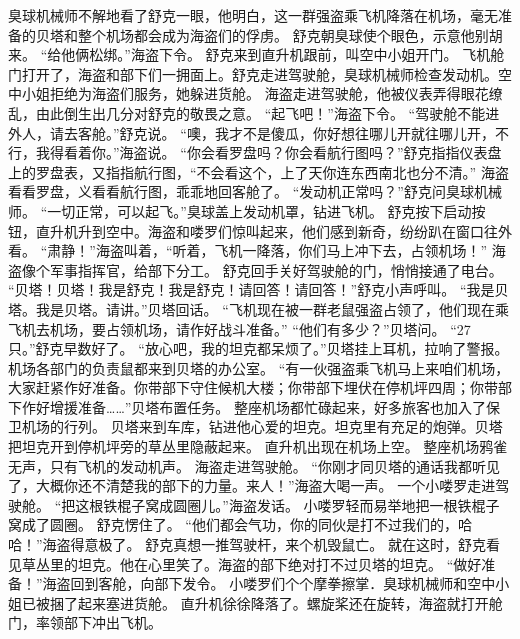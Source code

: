 \documentclass[a4paper,12pt,UTF8,twoside]{ctexbook}
\begin{document}
        臭球机械师不解地看了舒克一眼，他明白，这一群强盗乘飞机降落在机场，毫无准备的贝塔和整个机场都会成为海盗们的俘虏。 
        舒克朝臭球使个眼色，示意他别胡来。 
        “给他俩松绑。”海盗下令。 
        舒克来到直升机跟前，叫空中小姐开门。 
        飞机舱门打开了，海盗和部下们一拥面上。舒克走进驾驶舱，臭球机械师检查发动机。空中小姐拒绝为海盗们服务，她躲进货舱。 
        海盗走进驾驶舱，他被仪表弄得眼花缭乱，由此倒生出几分对舒克的敬畏之意。 
        “起飞吧！”海盗下令。 
        “驾驶舱不能进外人，请去客舱。”舒克说。 
        “噢，我才不是傻瓜，你好想往哪儿开就往哪儿开，不行，我得看着你。”海盗说。 
        “你会看罗盘吗？你会看航行图吗？”舒克指指仪表盘上的罗盘表，又指指航行图，“不会看这个，上了天你连东西南北也分不清。” 
        海盗看看罗盘，义看看航行图，乖乖地回客舱了。 
        “发动机正常吗？”舒克问臭球机械师。 
        “一切正常，可以起飞。”臭球盖上发动机罩，钻进飞机。 
        舒克按下启动按钮，直升机升到空中。海盗和喽罗们惊叫起来，他们感到新奇，纷纷趴在窗口往外看。 
        “肃静！”海盗叫着，“听着，飞机一降落，你们马上冲下去，占领机场！” 
        海盗像个军事指挥官，给部下分工。 
        舒克回手关好驾驶舱的门，悄悄接通了电台。 
        “贝塔！贝塔！我是舒克！我是舒克！请回答！请回答！”舒克小声呼叫。 
        “我是贝塔。我是贝塔。请讲。”贝塔回话。 
        “飞机现在被一群老鼠强盗占领了，他们现在乘飞机去机场，要占领机场，请作好战斗准备。” 
        “他们有多少？”贝塔问。 
        “27只。”舒克早数好了。 
        “放心吧，我的坦克都呆烦了。”贝塔挂上耳机，拉响了警报。 
        机场各部门的负责鼠都来到贝塔的办公室。 
        “有一伙强盗乘飞机马上来咱们机场，大家赶紧作好准备。你带部下守住候机大楼；你带部下埋伏在停机坪四周；你带部下作好增援准备……”贝塔布置任务。 
        整座机场都忙碌起来，好多旅客也加入了保卫机场的行列。 
        贝塔来到车库，钻进他心爱的坦克。坦克里有充足的炮弹。贝塔把坦克开到停机坪旁的草丛里隐蔽起来。 
        直升机出现在机场上空。 
        整座机场鸦雀无声，只有飞机的发动机声。 
        海盗走进驾驶舱。 
        “你刚才同贝塔的通话我都听见了，大概你还不清楚我的部下的力量。来人！”海盗大喝一声。 
        一个小喽罗走进驾驶舱。 
        “把这根铁棍子窝成圆圈儿。”海盗发话。 
        小喽罗轻而易举地把一根铁棍子窝成了圆圈。 
        舒克愣住了。 
        “他们都会气功，你的同伙是打不过我们的，哈哈！”海盗得意极了。 
        舒克真想一推驾驶杆，来个机毁鼠亡。 
        就在这时，舒克看见草丛里的坦克。他在心里笑了。海盗的部下绝对打不过贝塔的坦克。 
        “做好准备！”海盗回到客舱，向部下发令。 
        小喽罗们个个摩拳擦掌．臭球机械师和空中小姐已被捆了起来塞进货舱。 
        直升机徐徐降落了。螺旋桨还在旋转，海盗就打开舱门，率领部下冲出飞机。 
\end{document}

